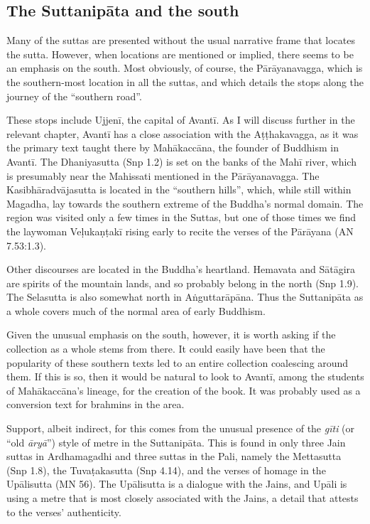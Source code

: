 \documentclass[12pt,openany]{book}%
\begin{document}
\subsection*{The \textsanskrit{Suttanipāta} and the south}

Many of the suttas are presented without the usual narrative frame that locates the sutta. However, when locations are mentioned or implied, there seems to be an emphasis on the south. Most obviously, of course, the \textsanskrit{Pārāyanavagga}, which is the southern-most location in all the suttas, and which details the stops along the journey of the “southern road”.

These stops include \textsanskrit{Ujjenī}, the capital of \textsanskrit{Avantī}. As I will discuss further in the relevant chapter, \textsanskrit{Avantī} has a close association with the \textsanskrit{Aṭṭhakavagga}, as it was the primary text taught there by \textsanskrit{Mahākaccāna}, the founder of Buddhism in \textsanskrit{Avantī}. The Dhaniyasutta (Snp 1.2) is set on the banks of the \textsanskrit{Mahī} river, which is presumably near the Mahissati mentioned in the \textsanskrit{Pārāyanavagga}. The \textsanskrit{Kasibhāradvājasutta} is located in the “southern hills”, which, while still within Magadha, lay towards the southern extreme of the Buddha’s normal domain. The region was visited only a few times in the Suttas, but one of those times we find the laywoman \textsanskrit{Veḷukaṇṭakī} rising early to recite the verses of the \textsanskrit{Pārāyana} (AN 7.53:1.3).

Other discourses are located in the Buddha’s heartland. Hemavata and \textsanskrit{Sātāgira} are spirits of the mountain lands, and so probably belong in the north (Snp 1.9). The Selasutta is also somewhat north in \textsanskrit{Aṅguttarāpāna}. Thus the \textsanskrit{Suttanipāta} as a whole covers much of the normal area of early Buddhism.

Given the unusual emphasis on the south, however, it is worth asking if the collection as a whole stems from there. It could easily have been that the popularity of these southern texts led to an entire collection coalescing around them. If this is so, then it would be natural to look to \textsanskrit{Avantī}, among the students of \textsanskrit{Mahākaccāna}’s lineage, for the creation of the book. It was probably used as a conversion text for brahmins in the area.

Support, albeit indirect, for this comes from the unusual presence of the \textit{\textsanskrit{gīti}} (or “old \textit{\textsanskrit{āryā}}”) style of metre in the \textsanskrit{Suttanipāta}. This is found in only three Jain suttas in Ardhamagadhi and three suttas in the Pali, namely the Mettasutta (Snp 1.8), the \textsanskrit{Tuvaṭakasutta} (Snp 4.14), and the verses of homage in the \textsanskrit{Upālisutta} (MN 56). The \textsanskrit{Upālisutta} is a dialogue with the Jains, and \textsanskrit{Upāli} is using a metre that is most closely associated with the Jains, a detail that attests to the verses’ authenticity.
\end{document}
